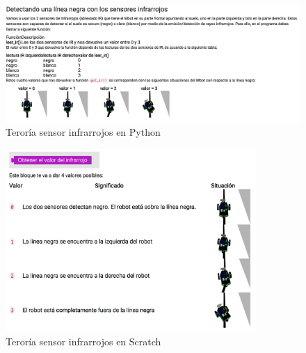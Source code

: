 \begin{figure}[H]
    \centering
    \includegraphics[width=1\textwidth, height=0.4\textwidth]{chapters/images/teoriag4python.png}
    \caption{Teroría sensor infrarrojos en Python}
    \label{fig:my_label}
\end{figure}
\begin{figure}[H]
    \centering
    \includegraphics[width=0.85\textwidth, height=0.45\textwidth]{chapters/images/teoriag4scratch.png}
    \caption{Teroría sensor infrarrojos en Scratch}
    \label{fig:my_label}
\end{figure}

